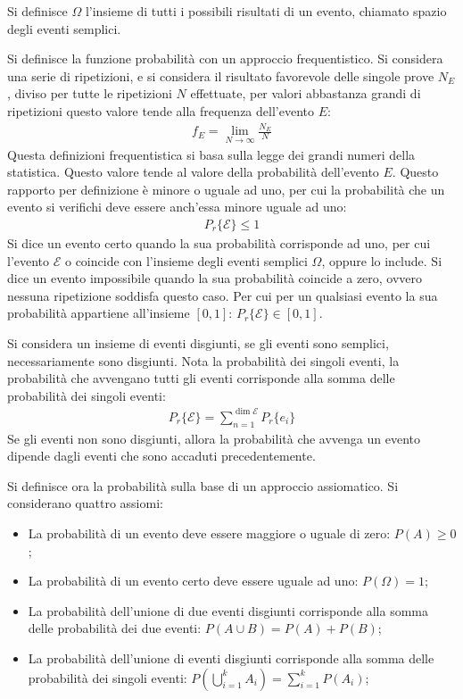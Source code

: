 \documentclass{article}
\numberwithin{equation}{subsection}
\begin{document}
Si definisce $\Omega$ l'insieme di tutti i possibili risultati di un evento, chiamato spazio degli eventi semplici. 

Si definisce la funzione probabilità con un approccio frequentistico. Si considera una serie di ripetizioni, e si considera il risultato favorevole delle singole prove $N_E$, diviso per 
tutte le ripetizioni $N$ effettuate, per valori abbastanza grandi di ripetizioni questo valore tende alla frequenza dell'evento $E$:
\begin{gather*}
    f_E=\lim_{N\to\infty}\displaystyle\frac{N_E}{N}
\end{gather*}
Questa definizioni frequentistica si basa sulla legge dei grandi numeri della statistica. Questo valore tende al valore della probabilità dell'evento $E$. 
Questo rapporto per definizione è minore o uguale ad uno, per cui la probabilità che un evento si verifichi deve essere anch'essa minore uguale ad uno:
\begin{gather*}
    P_r\{\mathscr{E}\}\leq1
\end{gather*}
Si dice un evento certo quando la sua probabilità corrisponde ad uno, per cui l'evento $\mathscr{E}$ o coincide con l'insieme degli eventi semplici $\Omega$, oppure lo include. 
Si dice un evento impossibile quando la sua probabilità coincide a zero, ovvero nessuna ripetizione soddisfa questo caso. Per cui per un qualsiasi evento la sua probabilità 
appartiene all'insieme $[0,1]$: $P_r\{\mathscr{E}\}\in[0,1]$. 

Si considera un insieme di eventi disgiunti, se gli eventi sono semplici, necessariamente sono disgiunti. Nota la probabilità dei singoli eventi, la probabilità che avvengano 
tutti gli eventi corrisponde alla somma delle probabilità dei singoli eventi:
\begin{gather*}
    P_r\{\mathscr{E}\}=\displaystyle\sum_{n=1}^{\dim\mathscr{E}}P_r\{{e}_i\}
\end{gather*}
Se gli eventi non sono disgiunti, allora la probabilità che avvenga un evento dipende dagli eventi che sono accaduti precedentemente. 


Si definisce ora la probabilità sulla base di un approccio assiomatico. Si considerano quattro assiomi: 
\begin{itemize}
    \item La probabilità di un evento deve essere maggiore o uguale di zero: $P(A)\geq0$;
    \item La probabilità di un evento certo deve essere uguale ad uno: $P(\Omega)=1$;
    \item La probabilità dell'unione di due eventi disgiunti corrisponde alla somma delle probabilità dei due eventi: $P(A\cup B)=P(A)+P(B)$;
    \item La probabilità dell'unione di eventi disgiunti corrisponde alla somma delle probabilità dei singoli eventi: $P\left(\displaystyle\bigcup_{i=1}^kA_i\right)=\sum_{i=1}^kP(A_i)$;
\end{itemize}
\end{document}
